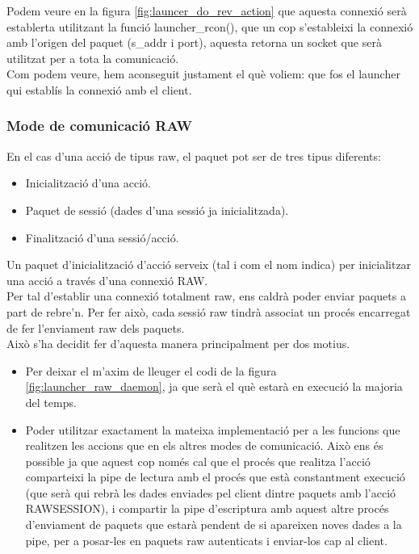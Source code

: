 Podem veure en la figura \ref{fig:launcer_do_rev_action} que aquesta connexió serà establerta utilitzant
la funció launcher\_rcon(), que un cop s'estableixi la connexió amb l'origen del paquet (s\_addr i port),
aquesta retorna un socket que serà utilitzat per a tota la comunicació. \\

Com podem veure, hem aconseguit justament el què voliem: que fos el launcher qui establís la connexió amb
el client.

\subsubsection{Mode de comunicació RAW}
En el cas d'una acció de tipus raw, el paquet pot ser de tres tipus diferents:
\begin{itemize}
\item Inicialització d'una acció.
\item Paquet de sessió (dades d'una sessió ja inicialitzada).
\item Finalització d'una sessió/acció.
\end{itemize}

Un paquet d'inicialització d'acció serveix (tal i com el nom indica) per inicialitzar una acció a través
d'una connexió RAW. \\

Per tal d'establir una connexió totalment raw, ens caldrà poder enviar paquets a part de rebre'n. Per fer 
això, cada sessió raw tindrà associat un procés encarregat de fer l'enviament raw dels paquets. \\

Això s'ha decidit fer d'aquesta manera principalment per dos motius.
\begin{itemize}
	\item Per deixar el m'axim de lleuger el codi de la figura \ref{fig:launcher_raw_daemon}, ja que serà 
		el què estarà en execució la majoria del temps.
	\item Poder utilitzar exactament la mateixa implementació per a les funcions que realitzen les accions
	que en els altres modes de comunicació. Això ens és possible ja que aquest cop només cal que el procés 
	que realitza l'acció comparteixi la pipe de lectura amb el procés que està constantment execució (que 
	serà qui rebrà les dades enviades pel client dintre paquets amb l'acció RAWSESSION), i compartir la pipe 
	d'escriptura amb aquest altre procés d'enviament de paquets que estarà pendent de si apareixen noves 
	dades a la pipe, per a posar-les en paquets raw autenticats i enviar-los cap al client.
\end{itemize}

